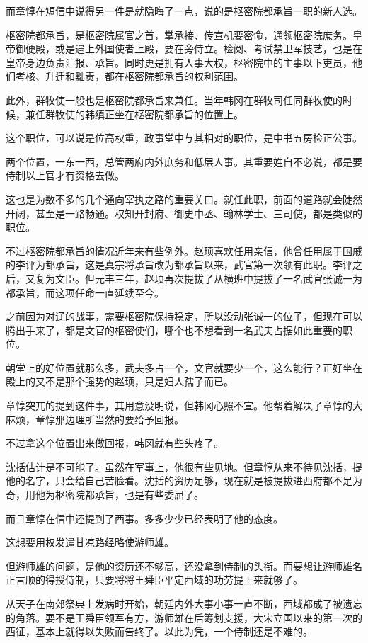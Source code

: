 而章惇在短信中说得另一件是就隐晦了一点，说的是枢密院都承旨一职的新人选。

枢密院都承旨，是枢密院属官之首，掌承接、传宣机要密命，通领枢密院庶务。皇帝御便殿，或是遇上外国使者上殿，要在旁侍立。检阅、考试禁卫军技艺，也是在皇帝身边负责汇报、承旨。同时更是拥有人事大权，枢密院中的主事以下吏员，他们考核、升迁和黜责，都在枢密院都承旨的权利范围。

此外，群牧使一般也是枢密院都承旨来兼任。当年韩冈在群牧司任同群牧使的时候，兼任群牧使的韩缜正坐在枢密院都承旨的位置上。

这个职位，可以说是位高权重，政事堂中与其相对的职位，是中书五房检正公事。

两个位置，一东一西，总管两府内外庶务和低层人事。其重要姓自不必说，都是要侍制以上官才有资格去做。

这也是为数不多的几个通向宰执之路的重要关口。就任此职，前面的道路就会陡然开阔，甚至是一路畅通。权知开封府、御史中丞、翰林学士、三司使，都是类似的职位。

不过枢密院都承旨的情况近年来有些例外。赵顼喜欢任用亲信，他曾任用属于国戚的李评为都承旨，这是真宗将承旨改为都承旨以来，武官第一次领有此职。李评之后，又复为文臣。但元丰三年，赵顼再次提拔了从横班中提拔了一名武官张诚一为都承旨，而这项任命一直延续至今。

之前因为对辽的战事，需要枢密院保持稳定，所以没动张诚一的位子，但现在可以腾出手来了，都是文官的枢密使们，哪个也不想看到一名武夫占据如此重要的职位。

朝堂上的好位置就那么多，武夫多占一个，文官就要少一个，这么能行？正好坐在殿上的又不是那个强势的赵顼，只是妇人孺子而已。

章惇突兀的提到这件事，其用意没明说，但韩冈心照不宣。他帮着解决了章惇的大麻烦，章惇那边理所当然的要给予回报。

不过拿这个位置出来做回报，韩冈就有些头疼了。

沈括估计是不可能了。虽然在军事上，他很有些见地。但章惇从来不待见沈括，提他的名字，只会给自己苦脸看。沈括的资历足够，现在就是被提拔进西府都不足为奇，用他为枢密院都承旨，也是有些委屈了。

而且章惇在信中还提到了西事。多多少少已经表明了他的态度。

这想要用权发遣甘凉路经略使游师雄。

但游师雄的问题，是他的资历还不够高，还没拿到侍制的头衔。而要想让游师雄名正言顺的得授侍制，只要将将王舜臣平定西域的功劳提上来就够了。

从天子在南郊祭典上发病时开始，朝廷内外大事小事一直不断，西域都成了被遗忘的角落。要不是王舜臣领军有方，游师雄在后筹划支援，大宋立国以来的第一次的西征，基本上就得以失败而告终了。以此为凭，一个侍制还是不难的。

